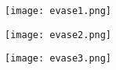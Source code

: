 \documentclass{article}
\begin{document}
\vspace{-0.7cm}

\begin{figure}[!htb]
    \centering
    \begin{subfigure}{0.3\textwidth}
        \centering
        \texttt{[image: evase1.png]}
    \end{subfigure}
    \begin{subfigure}{0.3\textwidth}
        \centering
        \texttt{[image: evase2.png]}
    \end{subfigure}
    \begin{subfigure}{0.3\textwidth}
        \centering
        \texttt{[image: evase3.png]}
    \end{subfigure}
\end{figure}
\end{document}
